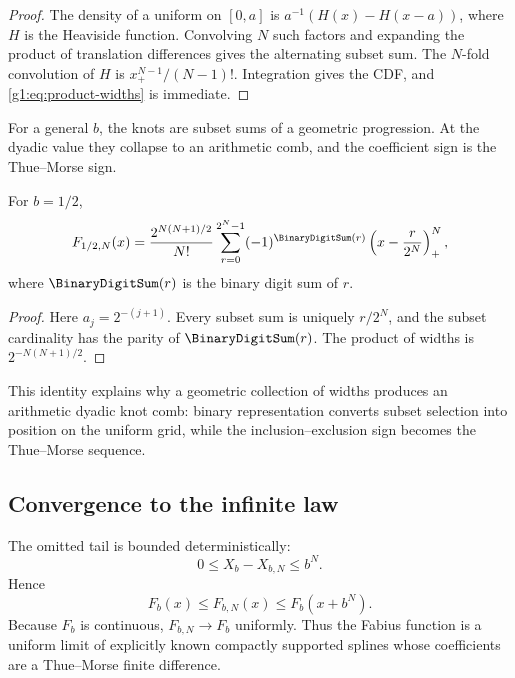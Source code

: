 \begin{proof}
The density of a uniform on $[0,a]$ is
$a^{-1}(H(x)-H(x-a))$, where $H$ is the Heaviside function.  Convolving $N$
such factors and expanding the product of translation differences gives the
alternating subset sum.  The $N$-fold convolution of $H$ is
$x_+^{N-1}/(N-1)!$.  Integration gives the CDF, and
\eqref{g1:eq:product-widths} is immediate.
\end{proof}

For a general $b$, the knots are subset sums of a geometric progression.  At
the dyadic value they collapse to an arithmetic comb, and the coefficient sign
is the Thue--Morse sign.

\begin{corollary}
For $b=1/2$,
\begin{equation}
 F_{1/2,N}(x)
 =\frac{2^{N(N+1)/2}}{N!}
 \sum_{r=0}^{2^N-1}(-1)^{\BinaryDigitSum(r)}
 \left(x-\frac{r}{2^N}\right)_+^N,
 \label{g1:eq:dyadic-finite-CDF}
\end{equation}
where $\BinaryDigitSum(r)$ is the binary digit sum of $r$.
\end{corollary}

\begin{proof}
Here $a_j=2^{-(j+1)}$.  Every subset sum is uniquely $r/2^N$, and the subset
cardinality has the parity of $\BinaryDigitSum(r)$.  The product of widths is
$2^{-N(N+1)/2}$.
\end{proof}

This identity explains why a geometric collection of widths produces an
arithmetic dyadic knot comb: binary representation converts subset selection
into position on the uniform grid, while the inclusion--exclusion sign becomes
the Thue--Morse sequence.

\subsection{Convergence to the infinite law}

The omitted tail is bounded deterministically:
\[
 0\le X_b-X_{b,N}\le b^N.
\]
Hence
\begin{equation}
 F_b(x)\le F_{b,N}(x)\le F_b(x+b^N).
 \label{g1:eq:CDF-sandwich}
\end{equation}
Because $F_b$ is continuous, $F_{b,N}\to F_b$ uniformly.  Thus the Fabius
function is a uniform limit of explicitly known compactly supported splines
whose coefficients are a Thue--Morse finite difference.

